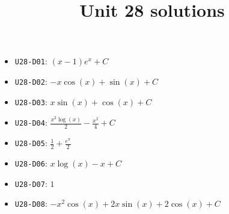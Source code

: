 \title{Unit 28 solutions}\maketitle\begin{itemize}
  \item \texttt{U28-D01}: $\left(x - 1\right) e^{x}+C$
  \item \texttt{U28-D02}: $- x \cos{\left(x \right)} + \sin{\left(x \right)}+C$
  \item \texttt{U28-D03}: $x \sin{\left(x \right)} + \cos{\left(x \right)}+C$
  \item \texttt{U28-D04}: $\frac{x^{2} \log{\left(x \right)}}{2} - \frac{x^{2}}{4}+C$
  \item \texttt{U28-D05}: $\frac{1}{2} + \frac{e^{\pi}}{2}$
  \item \texttt{U28-D06}: $x \log{\left(x \right)} - x+C$
  \item \texttt{U28-D07}: $1$
  \item \texttt{U28-D08}: $- x^{2} \cos{\left(x \right)} + 2 x \sin{\left(x \right)} + 2 \cos{\left(x \right)}+C$
\end{itemize}
